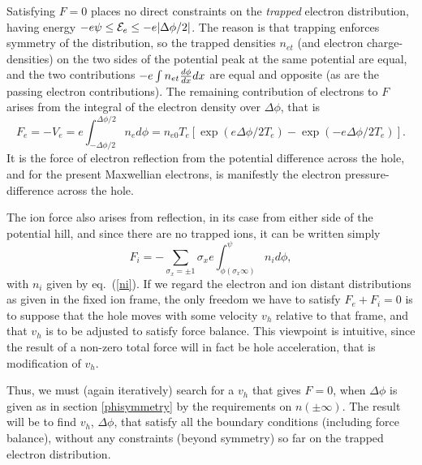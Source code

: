 \documentclass[pre]{revtex4-2}
\def\energy{{\cal E}}
\begin{document}
Satisfying $F=0$ places no direct constraints on the \emph{trapped}
electron distribution, having energy
$-e\psi\le \energy_e \le -e|\Delta \phi/2|$. The reason is that
trapping enforces symmetry of the distribution, so the trapped
densities $n_{et}$ (and electron charge-densities) on the two sides of
the potential peak at the same potential are equal, and the two contributions
$-e\int n_{et} {d\phi\over dx} dx$ are equal and opposite (as are the
passing electron contributions). The remaining
contribution of electrons to $F$ arises from the integral of the
electron density over $\Delta\phi$, that is
\begin{equation}\label{Fe}
F_e=-V_e=e\int_{-\Delta\phi/2}^{\Delta\phi/2} n_{e}
d\phi=n_{e0}T_e[\exp(e\Delta\phi/2T_e)-\exp(-e\Delta\phi/2T_e)].
\end{equation} It
is the force of electron reflection from the potential
difference across the hole, and for the present Maxwellian electrons,
is manifestly the electron pressure-difference across the hole.

The ion force also arises from reflection, in its case from either
side of the potential hill, and since there are no trapped ions, it
can be written simply
\begin{equation}\label{Fi}
F_i=-\sum_{\sigma_x=\pm1} \sigma_x e \int_{\phi(\sigma_x\infty)}^\psi
n_i d\phi,
\end{equation}
with $n_i$ given by eq.\ (\ref{ni}). If we regard the
electron and ion distant distributions as given in the fixed ion frame,
the only freedom we have to satisfy $F_e+F_i=0$ is to suppose that the
hole moves with some velocity $v_h$ relative to that frame, and that
$v_h$ is to be adjusted to satisfy force balance. This viewpoint is
intuitive, since the result of a non-zero total force will in fact be
hole acceleration, that is modification of $v_h$.

Thus, we must (again iteratively) search for a $v_h$ that gives $F=0$,
when $\Delta\phi$ is given as in section \ref{phisymmetry} by the
requirements on $n(\pm\infty)$. The result will be to find $v_h$,
$\Delta\phi$, that satisfy all the boundary conditions (including
force balance), without any constraints (beyond symmetry) so far on
the trapped electron distribution.
\end{document}
